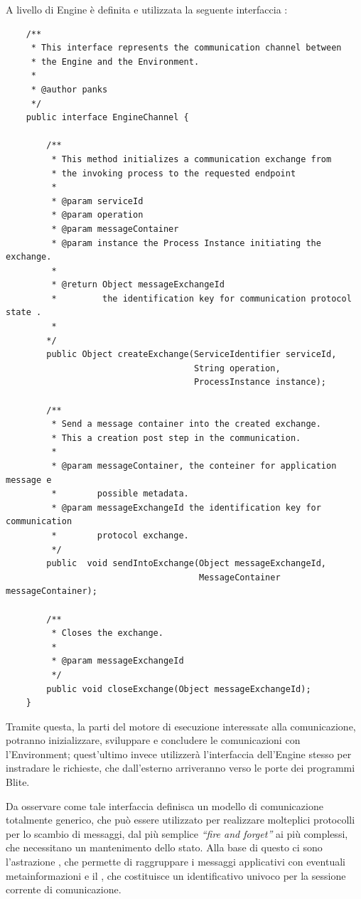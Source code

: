 \begin{enumerate}
  A livello di Engine è definita e utilizzata la seguente interfaccia
  :
	\begin{lstlisting}
	/**
	 * This interface represents the communication channel between 
 	 * the Engine and the Environment.  
 	 * 
 	 * @author panks
 	 */
	public interface EngineChannel {
		
   		/**
      	 * This method initializes a communication exchange from 
     	 * the invoking process to the requested endpoint
     	 * 
         * @param serviceId
     	 * @param operation
     	 * @param messageContainer
     	 * @param instance the Process Instance initiating the exchange.
     	 * 
     	 * @return Object messageExchangeId 
     	 *         the identification key for communication protocol state .
     	 *         
     	*/
     	public Object createExchange(ServiceIdentifier serviceId, 
        	                         String operation,
            	                     ProcessInstance instance);
   
    	/**
     	 * Send a message container into the created exchange. 
     	 * This a creation post step in the communication.
     	 * 
     	 * @param messageContainer, the conteiner for application message e
         *        possible metadata.
         * @param messageExchangeId the identification key for communication 
	     *        protocol exchange.
     	 */
    	public  void sendIntoExchange(Object messageExchangeId,
                                      MessageContainer messageContainer);

    	/**
     	 * Closes the exchange.
     	 * 
     	 * @param messageExchangeId
     	 */
    	public void closeExchange(Object messageExchangeId);
	}

  	\end{lstlisting} 

	Tramite questa, la parti del motore di esecuzione interessate alla
	comunicazione, potranno inizializzare, sviluppare e concludere le comunicazioni
	con l'Environment; quest'ultimo invece utilizzerà l'interfaccia dell'Engine
	stesso per instradare le richieste, che dall'esterno arriveranno verso
	le porte dei programmi Blite.
	
	Da osservare come tale interfaccia definisca un modello di comunicazione
	totalmente generico, che può essere utilizzato per realizzare molteplici
	protocolli per lo scambio di messaggi, dal più semplice \emph{``fire and
	forget''} ai più complessi, che necessitano un mantenimento dello stato.
	Alla base di questo ci sono l'astrazione , che
	permette di raggruppare i messaggi applicativi con eventuali
	metainformazioni e il , che costituisce un
	identificativo univoco per la sessione corrente di comunicazione.
	

\end{enumerate}
